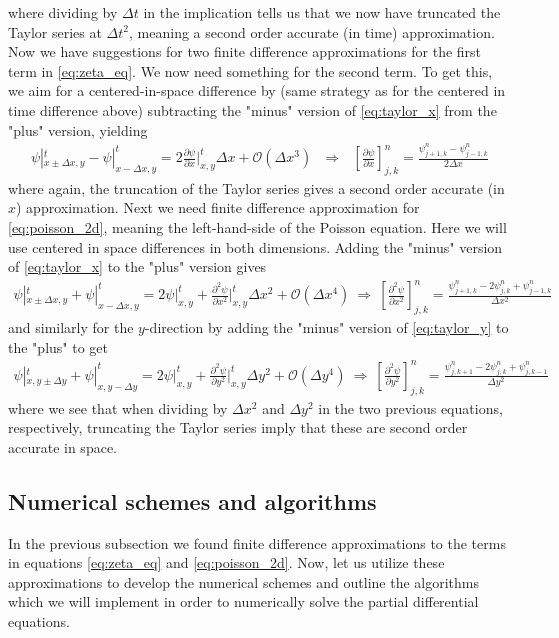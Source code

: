 \documentclass[12pt]{article}
\numberwithin{figure}{section}
\numberwithin{table}{section}
\newcommand{\dydx}{\frac{\partial\psi}{\partial x}}
\newcommand{\dyydxx}{\frac{\partial^2\psi}{\partial x^2}}
\newcommand{\dyydyy}{\frac{\partial^2\psi}{\partial y^2}}
\newcommand{\Ixyt}{|_{x,y}^{t}}
\newcommand{\IIxyt}{\Bigr|_{x,y}^{t}}
\newcommand{\Ixpyt}{|_{x\pm\Delta x,y}^{t}}
\newcommand{\Ixmyt}{|_{x-\Delta x,y}^{t}}
\newcommand{\Ixypt}{|_{x,y\pm\Delta y}^{t}}
\newcommand{\Ixymt}{|_{x,y-\Delta y}^{t}}
\begin{document}
where dividing by $\Delta t$ in the implication tells us that we now have truncated the Taylor series at $\Delta t^2$, meaning a second order accurate (in time) approximation. Now we have suggestions for two finite difference approximations for the first term in \eqref{eq:zeta_eq}. We now need something for the second term. To get this, we aim for a centered-in-space difference by (same strategy as for the centered in time difference above) subtracting the "minus" version of \eqref{eq:taylor_x} from the "plus" version, yielding
\begin{align}
	\psi\Ixpyt-\psi\Ixmyt=2\dydx\Ixyt\Delta x+\mathcal{O}(\Delta x^3)\ \ \ \Rightarrow \ \ \ \left[\dydx\right]_{j,k}^n=\frac{\psi_{j+1,k}^{n}-\psi_{j-1,k}^{n}}{2\Delta x} \label{eq:leapfrog_x_fda}
\end{align}
where again, the truncation of the Taylor series gives a second order accurate (in $x$) approximation. Next we need finite difference approximation for \eqref{eq:poisson_2d}, meaning the left-hand-side of the Poisson equation. Here we will use centered in space differences in both dimensions. Adding the "minus" version of \eqref{eq:taylor_x} to the "plus" version gives
\begin{align}
	\psi\Ixpyt+\psi\Ixmyt=2\psi\Ixyt+\dyydxx\IIxyt\Delta x^2+\mathcal{O}(\Delta x^4) \ \Rightarrow \ \left[\dyydxx\right]_{j,k}^n=\frac{\psi_{j+1,k}^n-2\psi_{j,k}^n+\psi_{j-1,k}^n}{\Delta x^2} \label{eq:second_derivative_fda_x}
\end{align}
and similarly for the $y$-direction by adding the "minus" version of \eqref{eq:taylor_y} to the "plus" to get
\begin{align}
	\psi\Ixypt+\psi\Ixymt=2\psi\Ixyt+\dyydyy\IIxyt\Delta y^2+\mathcal{O}(\Delta y^4) \ \Rightarrow \ \left[\dyydyy\right]_{j,k}^n=\frac{\psi_{j,k+1}^n-2\psi_{j,k}^n+\psi_{j,k-1}^n}{\Delta y^2} \label{eq:second_derivative_fda_y}
\end{align}
where we see that when dividing by $\Delta x^2$ and $\Delta y^2$ in the two previous equations, respectively, truncating the Taylor series imply that these are second order accurate in space. \\

\subsection{Numerical schemes and algorithms} \label{sec:algorithms}
In the previous subsection we found finite difference approximations to the terms in equations \eqref{eq:zeta_eq} and \eqref{eq:poisson_2d}. Now, let us utilize these approximations to develop the numerical schemes and outline the algorithms which we will implement in order to numerically solve the partial differential equations.
\end{document}
